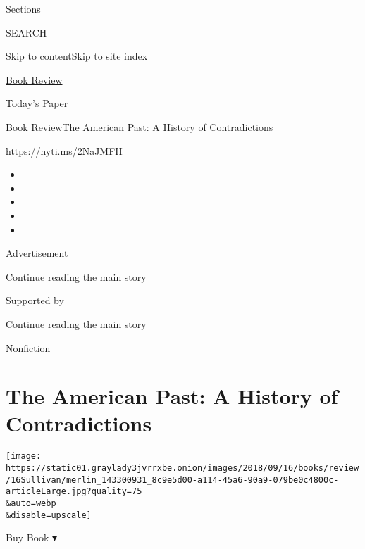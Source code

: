 Sections

SEARCH

\protect\hyperlink{site-content}{Skip to
content}\protect\hyperlink{site-index}{Skip to site index}

\href{https://www.nytimes3xbfgragh.onion/section/books/review}{Book
Review}

\href{https://myaccount.nytimes3xbfgragh.onion/auth/login?response_type=cookie\&client_id=vi}{}

\href{https://www.nytimes3xbfgragh.onion/section/todayspaper}{Today's
Paper}

\href{/section/books/review}{Book Review}\textbar{}The American Past: A
History of Contradictions

\url{https://nyti.ms/2NaJMFH}

\begin{itemize}
\item
\item
\item
\item
\item
\end{itemize}

Advertisement

\protect\hyperlink{after-top}{Continue reading the main story}

Supported by

\protect\hyperlink{after-sponsor}{Continue reading the main story}

Nonfiction

\hypertarget{the-american-past-a-history-of-contradictions}{%
\section{The American Past: A History of
Contradictions}\label{the-american-past-a-history-of-contradictions}}

\texttt{[image: https://static01.graylady3jvrrxbe.onion/images/2018/09/16/books/review/16Sullivan/merlin\_143300931\_8c9e5d00-a114-45a6-90a9-079be0c4800c-articleLarge.jpg?quality=75\\\&auto=webp\\\&disable=upscale]}

Buy Book ▾

